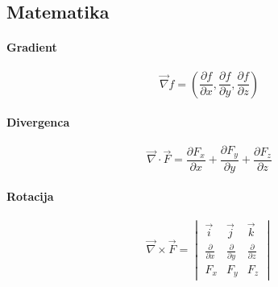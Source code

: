 \documentclass[a4paper,12pt]{article}
\begin{document}
\subsection{Matematika}
\begin{multicols}{2}

    \paragraph{Gradient}
    \begin{equation}
        \label{eq:gradient}
        \vec{\nabla} f = \left( \frac{\partial f}{\partial x}, \frac{\partial f}{\partial y}, \frac{\partial f}{\partial z} \right)
    \end{equation}

    \paragraph{Divergenca}
    \begin{equation}
        \label{eq:divergenca}
        \vec{\nabla} \cdot \vec{F} = \frac{\partial F_x}{\partial x} + \frac{\partial F_y}{\partial y} + \frac{\partial F_z}{\partial z}
    \end{equation}

    \paragraph{Rotacija}
    \begin{equation}
        \label{eq:rotacija}
        \vec{\nabla} \times \vec{F} = \begin{vmatrix}
            \vec{i}                     & \vec{j}                     & \vec{k}                     \\
            \frac{\partial}{\partial x} & \frac{\partial}{\partial y} & \frac{\partial}{\partial z} \\
            F_x                         & F_y                         & F_z
        \end{vmatrix}
    \end{equation}

\end{multicols}
\end{document}
